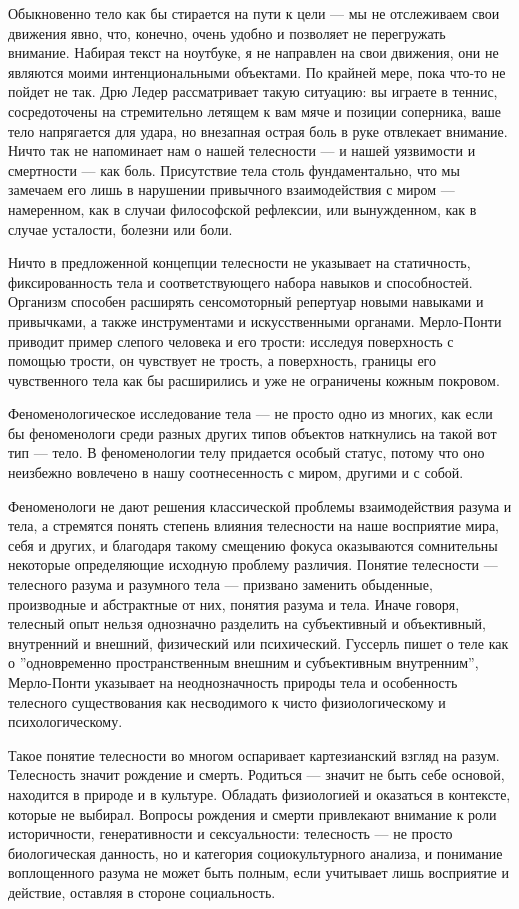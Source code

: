 \documentclass[11pt]{book}
\begin{document}
Обыкновенно тело как бы стирается на пути к цели --- мы не отслеживаем свои движения явно, что, конечно, очень удобно и позволяет не перегружать внимание. Набирая текст на ноутбуке, я не направлен на свои движения, они не являются моими интенциональными объектами. По крайней мере, пока что-то не пойдет не так. Дрю Ледер рассматривает такую ситуацию: вы играете в теннис, сосредоточены на стремительно летящем к вам мяче и позиции соперника, ваше тело напрягается для удара, но внезапная острая боль в руке отвлекает внимание. Ничто так не напоминает нам о нашей телесности --- и нашей уязвимости и смертности --- как боль. Присутствие тела столь фундаментально, что мы замечаем его лишь в нарушении привычного взаимодействия с миром --- намеренном, как в случаи философской рефлексии, или вынужденном, как в случае усталости, болезни или боли.

Ничто в предложенной концепции телесности не указывает на статичность, фиксированность тела и соответствующего набора навыков и способностей. Организм способен расширять сенсомоторный репертуар новыми навыками и привычками, а также инструментами и искусственными органами. Мерло-Понти приводит пример слепого человека и его трости: исследуя поверхность с помощью трости, он чувствует не трость, а поверхность, границы его чувственного тела как бы расширились и уже не ограничены кожным покровом.

Феноменологическое исследование тела --- не просто одно из многих, как если бы феноменологи среди разных других типов объектов наткнулись на такой вот тип --- тело. В феноменологии телу придается особый статус, потому что оно неизбежно вовлечено в нашу соотнесенность с миром, другими и с собой.

Феноменологи не дают решения классической проблемы взаимодействия разума и тела, а стремятся понять степень влияния телесности на наше восприятие мира, себя и других, и благодаря такому смещению фокуса оказываются сомнительны некоторые определяющие исходную проблему различия. Понятие телесности --- телесного разума и разумного тела --- призвано заменить обыденные, производные и абстрактные от них, понятия разума и тела. Иначе говоря, телесный опыт нельзя однозначно разделить на субъективный и объективный, внутренний и внешний, физический или психический. Гуссерль пишет о теле как о ''одновременно пространственным внешним и субъективным внутренним'', Мерло-Понти указывает на неоднозначность природы тела и особенность телесного существования как несводимого к чисто физиологическому и психологическому.

Такое понятие телесности во многом оспаривает картезианский взгляд на разум. Телесность значит рождение и смерть. Родиться --- значит не быть себе основой, находится в природе и в культуре. Обладать физиологией и оказаться в контексте, которые не выбирал. Вопросы рождения и смерти привлекают внимание к роли историчности, генеративности и сексуальности: телесность --- не просто биологическая данность, но и категория социокультурного анализа, и понимание воплощенного разума не может быть полным, если учитывает лишь восприятие и действие, оставляя в стороне социальность.
\end{document}
